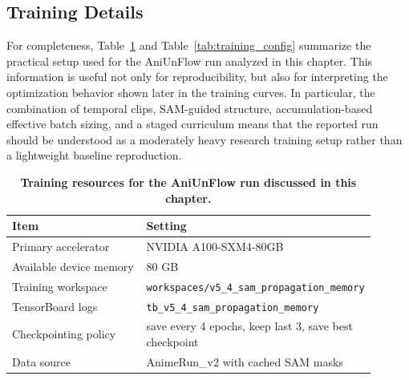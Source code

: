 \subsection{Training Details}

For completeness, Table~\ref{tab:training_resources} and Table~\ref{tab:training_config} summarize the practical setup used for the AniUnFlow run analyzed in this chapter. This information is useful not only for reproducibility, but also for interpreting the optimization behavior shown later in the training curves. In particular, the combination of temporal clips, SAM-guided structure, accumulation-based effective batch sizing, and a staged curriculum means that the reported run should be understood as a moderately heavy research training setup rather than a lightweight baseline reproduction.

\begin{table}[t]
\centering
\caption{\textbf{Training resources for the AniUnFlow run discussed in this chapter.}}
\label{tab:training_resources}
\small
\begin{tabular}{p{0.42\linewidth}p{0.48\linewidth}}
\toprule
\textbf{Item} & \textbf{Setting} \\
\midrule
Primary accelerator & NVIDIA A100-SXM4-80GB \\
Available device memory & 80 GB \\
Training workspace & \texttt{workspaces/v5\_4\_sam\_propagation\_memory} \\
TensorBoard logs & \texttt{tb\_v5\_4\_sam\_propagation\_memory} \\
Checkpointing policy & save every 4 epochs, keep last 3, save best checkpoint \\
Data source & AnimeRun\_v2 with cached SAM masks \\
\bottomrule
\end{tabular}
\end{table}

